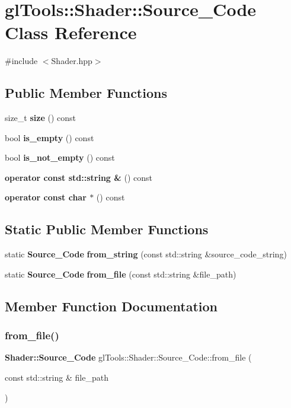 \section{gl\+Tools\+::Shader\+::Source\+\_\+\+Code Class Reference}
\label{classgl_tools_1_1_shader_1_1_source___code}


{\ttfamily \#include $<$Shader.\+hpp$>$}

\subsection*{Public Member Functions}
\begin{DoxyCompactItemize}
\item 
size\+\_\+t \textbf{ size} () const
\item 
bool \textbf{ is\+\_\+empty} () const
\item 
bool \textbf{ is\+\_\+not\+\_\+empty} () const
\item 
\textbf{ operator const std\+::string \&} () const
\item 
\textbf{ operator const char $\ast$} () const
\end{DoxyCompactItemize}
\subsection*{Static Public Member Functions}
\begin{DoxyCompactItemize}
\item 
static \textbf{ Source\+\_\+\+Code} \textbf{ from\+\_\+string} (const std\+::string \&source\+\_\+code\+\_\+string)
\item 
static \textbf{ Source\+\_\+\+Code} \textbf{ from\+\_\+file} (const std\+::string \&file\+\_\+path)
\end{DoxyCompactItemize}


\subsection{Member Function Documentation}
\mbox{\label{classgl_tools_1_1_shader_1_1_source___code_ac06def75724eff10639bfd79bc1b0b9d}} 
\subsubsection{from\_file()}
{\footnotesize\ttfamily \textbf{ Shader\+::\+Source\+\_\+\+Code} gl\+Tools\+::\+Shader\+::\+Source\+\_\+\+Code\+::from\+\_\+file (\begin{DoxyParamCaption}\item[{const std\+::string \&}]{file\+\_\+path }\end{DoxyParamCaption})\hspace{0.3cm}{\ttfamily [static]}}

